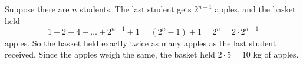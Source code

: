 Suppose there are $n$ students. The last student gets $2^{n-1}$ apples, and the basket held
\[
1+2+4+\dots+2^{n-1}+1=(2^n-1)+1=2^n=2\cdot2^{n-1}
\]
apples. So the basket held exactly twice as many apples as the last student received. Since the apples weigh the same, the basket held $2\cdot5=\boxed{10}$ kg of apples.
